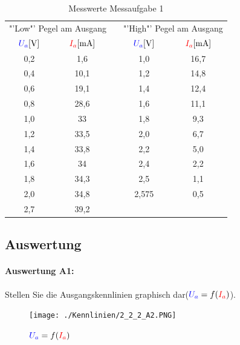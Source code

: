 \documentclass[a4paper,titlepage,parskip]{scrreprt}
\newcommand{\spannung}[1]{\textcolor{blue}{#1}}
\newcommand{\strom}[1]{\textcolor{red}{#1}}
\begin{document}
          \begin{center}
            \begin{table}[!hbtp]
              \caption{Messwerte Messaufgabe 1}
              \renewcommand{\arraystretch}{1.3}
              \begin{center}
                \begin{tabular}{cc|c|cc}
                  \multicolumn{2}{c|}{"'Low"' Pegel am Ausgang} &&\multicolumn{2}{c}{"'High"' Pegel am Ausgang}\\
                  $\spannung{U_a} [\si{\volt}]$ & $\strom{I_a} [\si{\milli\ampere}] $&& $\spannung{U_a} [\si{\volt}]$ & $\strom{I_a} [\si{\milli\ampere}] $\\ \hline
                  0,2 & 1,6 &  & 1,0 & 16,7\\
                  0,4 & 10,1 &  & 1,2 & 14,8\\
                  0,6 & 19,1 &  & 1,4 & 12,4\\
                  0,8 & 28,6 &  & 1,6 & 11,1\\
                  1,0 & 33 &  & 1,8 & 9,3\\
                  1,2 & 33,5 &  & 2,0 & 6,7\\
                  1,4 & 33,8 &  & 2,2 & 5,0\\
                  1,6 & 34 &  & 2,4 & 2,2\\
                  1,8 & 34,3 &  & 2,5 & 1,1\\
                  2,0 & 34,8 &  &  2,575 & 0,5\\
                  2,7 & 39,2 &  & &
                \end{tabular}
              \end{center}
            \end{table}
          \end{center}


      \subsection{Auswertung}
        \paragraph{Auswertung A1:} Stellen Sie die Ausgangskennlinien graphisch dar($\spannung{U_a} = f(\strom{I_a})$).

         \begin{figure}[!htbp]
             \begin{center}
                 \texttt{[image: ./Kennlinien/2\_2\_2\_A2.PNG]}
             \end{center}
             \caption{$\spannung{U_a} = f(\strom{I_a})$}
         \end{figure}
\end{document}
